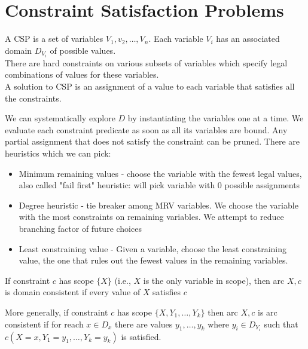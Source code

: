 \documentclass[a4paper]{article}
\theoremstyle{plain}
\theoremstyle{definition}
\newtheorem{defn}{Definition}[section]
\theoremstyle{remark}
\begin{document}
\section{Constraint Satisfaction Problems}
\begin{tcolorbox}[colback=black!3!white,colframe=black!60!white,title=\begin{defn}CSP \label{CSP}\end{defn}]
A CSP is a set of variables $V_1,v_2,\ldots,V_n$. Each variable $V_i$ has an associated domain $D_{V_i}$ of possible values. \\
There are hard constraints on various subsets of variables which specify legal combinations of values for these variables. \\
A solution to CSP is an assignment of a value to each variable that satisfies all the constraints.
\end{tcolorbox}
We can systematically explore $D$ by instantiating the variables one at a time. We evaluate each constraint predicate as soon as all its variables are bound. Any partial assignment that does not satisfy the constraint can be pruned. There are heuristics which we can pick:
\begin{itemize}
	\item Minimum remaining values - choose the variable with the fewest legal values, also called "fail first" heuristic: will pick variable with $0$ possible assignments
	\item Degree heuristic - tie breaker among MRV variables. We choose the variable with the most constraints on remaining variables. We attempt to reduce branching factor of future choices
	\item Least constraining value - Given a variable, choose the least constraining value, the one that rules out the fewest values in the remaining variables.
\end{itemize}
\begin{tcolorbox}[colback=black!3!white,colframe=black!60!white,title=\begin{defn}Domain Consistent \label{Domain Consistent}\end{defn}]
If constraint $c$ has scope $\{X\}$ (i.e., $X$ is the only variable in scope), then arc $X,c$ is domain consistent if every value of $X$ satisfies $c$ 
\end{tcolorbox}
\begin{tcolorbox}[colback=black!3!white,colframe=black!60!white,title=\begin{defn}Arc Consistency \label{Arc Consistency}\end{defn}]
More generally, if constraint $c$ has scope $\{X,Y_1,\ldots,Y_k\}$ then arc $X,c$ is arc consistent if for reach $x \in D_x$ there are values $y_1,\ldots,y_k$ where $y_i \in D_{Y_i}$ such that $c(X=x,Y_1=y_1,\ldots,Y_k=y_k)$ is satisfied.
\end{tcolorbox}
\end{document}
